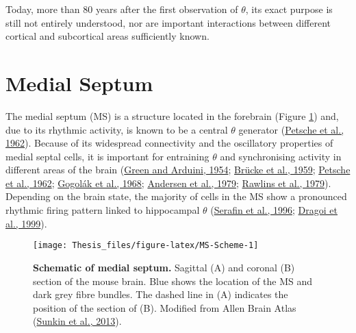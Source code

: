 \documentclass[
  12pt,
  a4paper,
  openany]{book}
\begin{document}
Today, more than 80 years after the first observation of \(\theta\), its exact purpose is still not entirely understood, nor are important interactions between different cortical and subcortical areas sufficiently known.

\hypertarget{medial-septum}{%
\section{Medial Septum}\label{medial-septum}}

The medial septum (MS) is a structure located in the forebrain (Figure \ref{fig:MS-Scheme}) and, due to its rhythmic activity, is known to be a central \(\theta\) generator (\protect\hyperlink{ref-petsche_significance_1962}{Petsche et al., 1962}). Because of its widespread connectivity and the oscillatory properties of medial septal cells, it is important for entraining \(\theta\) and synchronising activity in different areas of the brain (\protect\hyperlink{ref-green_hippocampal_1954}{Green and Arduini, 1954}; \protect\hyperlink{ref-brucke_beeinflussung_1959}{Brücke et al., 1959}; \protect\hyperlink{ref-petsche_significance_1962}{Petsche et al., 1962}; \protect\hyperlink{ref-gogolak_firing_1968}{Gogolák et al., 1968}; \protect\hyperlink{ref-andersen_septo-hippocampal_1979}{Andersen et al., 1979}; \protect\hyperlink{ref-rawlins_septo-hippocampal_1979}{Rawlins et al., 1979}). Depending on the brain state, the majority of cells in the MS show a pronounced rhythmic firing pattern linked to hippocampal \(\theta\) (\protect\hyperlink{ref-serafin_rhythmic_1996}{Serafin et al., 1996}; \protect\hyperlink{ref-dragoi_interactions_1999}{Dragoi et al., 1999}).




\begin{figure}[H]

{\centering \texttt{[image: Thesis\_files/figure-latex/MS-Scheme-1]} 

}

\caption[Schematic of medial septum]{\textbf{Schematic of medial septum.} Sagittal (A) and coronal (B) section of the mouse brain. Blue shows the location of the MS and dark grey fibre bundles. The dashed line in (A) indicates the position of the section of (B). Modified from Allen Brain Atlas (\protect\hyperlink{ref-sunkin_allen_2013}{Sunkin et al., 2013}).}\label{fig:MS-Scheme}
\end{figure}
\end{document}
